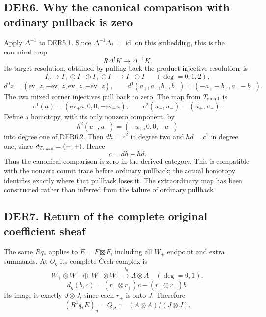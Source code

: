 \subsection{DER6. Why the canonical comparison with ordinary pullback is
zero}\label{der6.-why-the-canonical-comparison-with-ordinary-pullback-is-zero}

Apply \(\Delta^{-1}\) to DER5.1. Since
\(\Delta^{-1}\Delta_*=\operatorname{id}\) on this embedding, this is the
canonical map \[
R\Delta^!K\longrightarrow\Delta^{-1}K.
\tag{DER6.1}
\] Its target resolution, obtained by pulling back the product injective
resolution, is \[
I_\eta\longrightarrow
I_+\oplus I_-\oplus I_+\oplus I_-
\longrightarrow I_+\oplus I_-
\quad(\deg=0,1,2),
\] \[
d^0z=(\mathrm{ev}_+z,-\mathrm{ev}_-z,
       \mathrm{ev}_+z,-\mathrm{ev}_-z),\qquad
d^1(a_+,a_-,b_+,b_-)=(-a_++b_+,a_--b_-).
\tag{DER6.2}
\] The two mixed corner injectives pull back to zero. The map from
\(T_{\rm small}\) is \[
c^1(a)=(\mathrm{ev}_+a,0,0,-\mathrm{ev}_-a),\qquad
c^2(u_+,u_-)=(u_+,u_-).
\] Define a homotopy, with its only nonzero component, by \[
h^2(u_+,u_-)=(-u_+,0,0,-u_-)
\] into degree one of DER6.2. Then \(d h=c^2\) in degree two and
\(h d=c^1\) in degree one, since \(d_{T_{\rm small}}=(-,+)\). Hence \[
\boxed{c=dh+hd.}
\tag{DER6.3}
\] Thus the canonical comparison is zero in the derived category. This
is compatible with the nonzero counit trace before ordinary pullback;
the actual homotopy identifies exactly where that pullback loses it. The
extraordinary map has been constructed rather than inferred from the
failure of ordinary pullback.

\subsection{DER7. Return of the complete original coefficient
sheaf}\label{der7.-return-of-the-complete-original-coefficient-sheaf}

The same \(Rq_*\) applies to \(E=F\boxtimes F\), including all \(W_\pm\)
endpoint and extra summands. At \(O_\eta\) its complete Čech complex is
\[
W_+\otimes W_-\ \oplus\ W_-\otimes W_+
 \xrightarrow{d_\eta} A\otimes A
\quad(\deg=0,1),
\] \[
d_\eta(b,c)=(r_-\otimes r_+)c-(r_+\otimes r_-)b.
\tag{DER7.1}
\] Its image is exactly \(J\otimes J\), since each \(r_\pm\) is onto
\(J\). Therefore \[
(R^1q_*E)_\eta=Q_\Delta:=(A\otimes A)/(J\otimes J).
\tag{DER7.2}
\]

